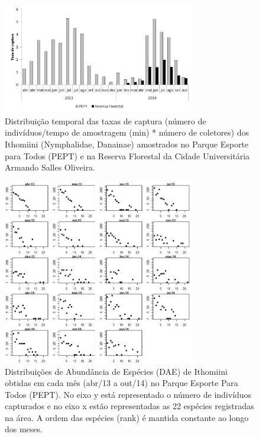 \documentclass[12pt, A4]{article}
\begin{document}
\begin{figure}
  \centering
  \includegraphics[width=0.75\textwidth]{figures/Imagem4/Imagem4.jpg}
  \caption{Distribuição temporal das taxas de captura (número de indivíduos/tempo de amostragem (min) * número de coletores) dos Ithomiini (Nymphalidae, Danainae) amostrados no Parque Esporte para Todos (PEPT) e na Reserva Florestal da Cidade Universitária Armando Salles Oliveira.}
  \label{fig:2.1.3} 
\end{figure}

\begin{figure}
  \centering
\includegraphics[width=0.75\textwidth]{figures/Imagem5/Imagem5.jpg}
  \caption{Distribuições de Abundância de Espécies (DAE) de Ithomiini obtidas em cada mês (abr/13 a out/14) no Parque Esporte Para Todos (PEPT). No eixo y está representado o número de indivíduos capturados e no eixo x estão representadas as 22 espécies registradas na área. A ordem das espécies (rank) é mantida constante ao longo dos meses.}
  \label{fig:2.1.4} 
\end{figure}
\end{document}
